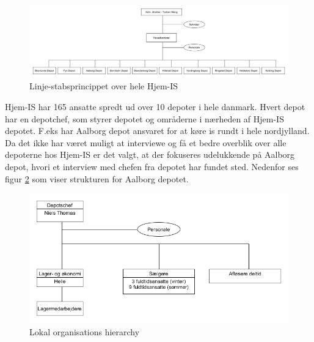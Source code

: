 \begin{landscape}
    \begin{figure}[p]
        \centering
        \includegraphics[width=\hsize]{figures/businesscase/global_hierarchy.png}
        \caption{Linje-stabsprincippet over hele Hjem-IS}
        \label{fig:global_hierarchy}
    \end{figure}        
\end{landscape}

Hjem-IS har 165 ansatte spredt ud over 10 depoter i hele danmark. Hvert depot har en depotchef, som styrer depotet og områderne i nærheden af Hjem-IS depotet. F.eks har Aalborg depot ansvaret for at køre is rundt i hele nordjylland. Da det ikke har været muligt at interviewe og få et bedre overblik over alle depoterne hos Hjem-IS er det valgt, at der fokuseres udelukkende på Aalborg depot, hvori et interview med chefen fra depotet har fundet sted. Nedenfor ses figur \ref{fig:local_hierarchy} som viser strukturen for Aalborg depotet. 

\begin{figure}[H]
    \centering
    \includegraphics[width=\textwidth]{figures/businesscase/local_hierarchy.png}
    \caption{Lokal organisations hierarchy}
    \label{fig:local_hierarchy}
\end{figure}

